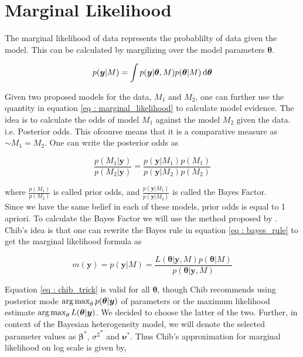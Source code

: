 
\section{Marginal Likelihood}
\label{sec : marginal_likelihood}

The marginal likelihood of data represents the probablilty of data given the model. This can be calculated by margilizing over the model parameters $\boldsymbol{\theta}$. 

\begin{equation}
\label{eq : marginal_likelihood}
p(\boldsymbol{y}|M) = \int p(\boldsymbol{y}|\boldsymbol{\theta}, M) p(\boldsymbol{\theta}|M) \mathop{}\!\mathrm{d} \boldsymbol{\theta}
\end{equation}

Given two proposed models for the data, $M_1$ and $M_2$, one can further use the quantity in equation \ref{eq : marginal_likelihood} to calculate model evidence. The idea is to calculate the odds of model $M_1$ against the model $M_2$ given the data. i.e. Posterior odds. This ofcourse means that it is a comparative measure as $\sim M_1 = M_2$. One can write the posterior odds as

$$\frac {p(M_1|\boldsymbol{y})}{p(M_2|\boldsymbol{y})} = \frac {p(\boldsymbol{y}|M_1) p(M_1)} {p(\boldsymbol{y}|M_2) p(M_2)}$$

where $\frac {p(M_1)}{p(M_2)}$ is called prior odds, and $\frac {p(\boldsymbol{y}|M_1)} {p(\boldsymbol{y}|M_2)}$ is called the Bayes Factor.\\

Since we have the same belief in each of these models, prior odds is equal to 1 apriori. To calculate the Bayes Factor we will use the method proposed by \citet{chib_marginal_1995}. Chib's idea is that one can rewrite the Bayes rule in equation \ref{eq : bayes_rule} to get the marginal likelihood formula as

\begin{equation}
\label{eq : chib_trick}
m(\boldsymbol{y}) = p(\boldsymbol{y}|M) = \dfrac {L(\boldsymbol{\theta}|\boldsymbol{y}, M) p(\boldsymbol{\theta}|M)} {p(\boldsymbol{\theta}|\boldsymbol{y}, M)}
\end{equation}

Equation \ref{eq : chib_trick} is valid for all $\boldsymbol{\theta}$, though Chib recommends using posterior mode $\operatorname*{arg\,max}_\theta p(\boldsymbol{\theta}|\boldsymbol{y})$ of parameters or the maximum likelihood estimate $\operatorname*{arg\,max}_\theta L(\boldsymbol{\theta}|\boldsymbol{y})$. We decided to choose the latter of the two. Further, in context of the Bayesian heterogeneity model, we will denote the selected parameter values as ${\boldsymbol{\beta}}^*$, ${\sigma^2}^*$ and $\boldsymbol{\nu}^*$. Thus Chib's approximation for marginal likelihood on log scale is given by,

